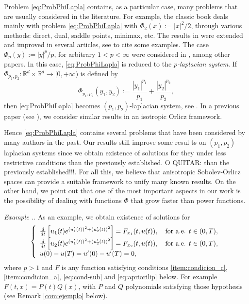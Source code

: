 \documentclass[twoside]{article}
\theoremstyle{remark}
\newcounter{example}[section]
\newenvironment{example}{\refstepcounter{example}\noindent\textit{Example \arabic{section}.\arabic{example}}.}{ }
\newcommand{\rr}{\mathbb{R}}
\begin{document}
  Problem \eqref{eq:ProbPhiLapla} contains, as a particular case, many problems that are usually considered in the literature.  For example, the classic book  \cite{mawhin2010critical} deals mainly with problem \eqref{eq:ProbPhiLapla} with $\Phi_2(x):=|x|^2/2$, through various methods: direct, dual, saddle points,  minimax, etc. The results in \cite{mawhin2010critical} were extended and improved in several articles,  see  \cite{tang1998periodic,tang2001periodic,tang1995periodic,wu1999periodic,zhao2004periodic}  to cite some examples. The case $\Phi_p(y):=|y|^p/p$, for arbitrary $1<p<\infty$ were considered in  \cite{tang2010periodic,Tian2007192}, among other papers. In this case, \eqref{eq:ProbPhiLapla} is reduced to the \emph{$p$-laplacian system}.  If $\Phi_{p_1,p_2}:\rr^d\times \rr^d\to [0,+\infty)$  is defined by
\begin{equation}\label{eq:phip_1p_2}\Phi_{p_1,p_2}(y_1,y_2):=\frac{|y_1|^{p_1}}{p_1}+\frac{|y_2|^{p_2}}{p_2},\end{equation}
then \eqref{eq:ProbPhiLapla} becomes  $(p_1,p_2)$-laplacian system, see
\cite{li2014periodic,pasca2010periodic,pacsca2010some,pasca2011some,pasca2016periodic,yang2012periodic,yang2013existence}.  In a previous paper (see \cite{ABGMS2015}), we consider similar results in an isotropic Orlicz framework.


Hence \eqref{eq:ProbPhiLapla}  contains several problems that have been considered by many authors in the past. Our results still improve some resul ts on $(p_1,p_2)$-laplacian systems since we obtain existence  of solutions for they under  less restrictive conditions than the previously established. O QUITAR: than the previously established!!!.   
For all this, we believe that anisotropic Sobolev-Orlicz spaces can provide a suitable framework to  unify many known results. On the other hand, we point out that one of the most important aspects in our work  is the possibility of dealing with  functions $\Phi$ that grow faster than power functions. 

\begin{example}\label{ex:RandEx} As an example, we obtain existence of solutions for 
\begin{equation}\label{eq:RandExample}
    \left\{%
\begin{array}{ll}
  \frac{d}{dt} \left[u_1(t)e^{(u_1'(t))^2+(u_2'(t))^2}\right]= F_{x_1}(t,u(t)), \quad \hbox{for a.e. } t \in (0,T),\\
   \frac{d}{dt} \left[u_2(t)e^{(u_1'(t))^2+(u_2'(t))^2}\right]= F_{x_2}(t,u(t)), \quad \hbox{for a.e. } t \in (0,T),\\
    u(0)-u(T)=u'(0)-u'(T)=0,
\end{array}%
\right. 
\end{equation}
where $p>1$ and $F$ is any function satisfying conditions \ref{item:condicion_c}, \ref{item:condicion_a}, \eqref{eq:cond-sub} and \eqref{eq:apriorilip} below. For example  $F(t,x)=P(t)Q(x)$, with $P$ and $Q$ polynomials satisfying those hypothesis (see Remark \ref{com:ejemplo} below).
\end{example}
\end{document}

